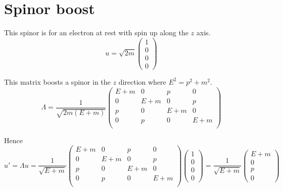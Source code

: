 



\section*{Spinor boost}

This spinor is for an electron at rest with spin up along the $z$ axis.
\begin{equation*}
u=\sqrt{2m}\begin{pmatrix}1\\0\\0\\0\end{pmatrix}
\end{equation*}

This matrix boosts a spinor in the $z$ direction where $E^2=p^2+m^2$.
\begin{equation*}
\Lambda=\frac{1}{\sqrt{2m(E+m)}}
\begin{pmatrix}
E+m & 0 & p & 0\\
0 & E+m & 0 & p\\
p & 0 & E+m & 0\\
0 & p & 0 & E+m\\
\end{pmatrix}
\end{equation*}

Hence
\begin{equation*}
u'=\Lambda u=\frac{1}{\sqrt{E+m}}
\begin{pmatrix}
E+m & 0 & p & 0\\
0 & E+m & 0 & p\\
p & 0 & E+m & 0\\
0 & p & 0 & E+m\\
\end{pmatrix}
\begin{pmatrix}1\\0\\0\\0\end{pmatrix}
=\frac{1}{\sqrt{E+m}}\begin{pmatrix}E+m\\0\\p\\0\end{pmatrix}
\end{equation*}


